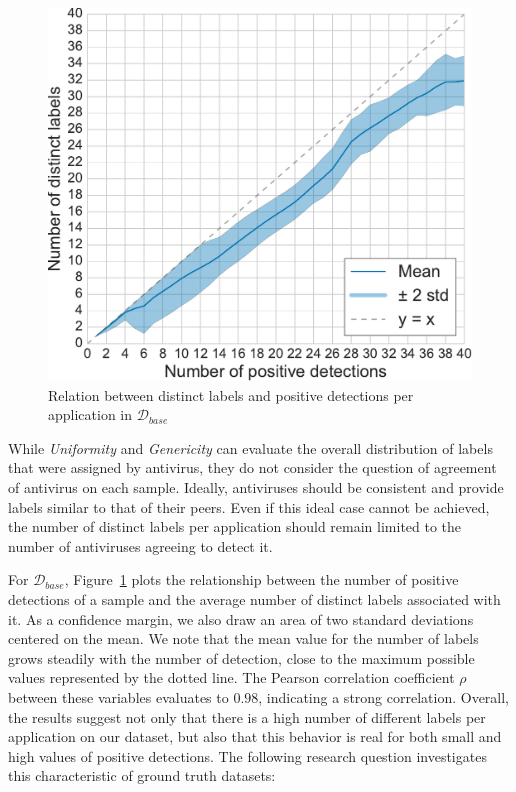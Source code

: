\begin{figure}[!ht]
        \centering
	\includegraphics[width=0.75\linewidth]{figures/stase/divergence.pdf}
        \caption[Relation between distinct labels and positive detections per application]{Relation between distinct labels and positive detections per application in $\mathcal{D}_{base}$}
	\label{figure:stase:divergence}
\end{figure}

While \emph{Uniformity} and \emph{Genericity} can evaluate the overall distribution of labels that were assigned by antivirus, they do not consider the question of agreement of antivirus on each sample.
Ideally, antiviruses should be consistent and provide labels similar to that of their peers.
Even if this ideal case cannot be achieved, the number of distinct labels per application should remain limited to the number of antiviruses agreeing to detect it.

For $\mathcal{D}_{base}$, Figure~\ref{figure:stase:divergence} plots the relationship between the number of positive detections of a sample and the average number of distinct labels associated with it.
As a confidence margin, we also draw an area of two standard deviations centered on the mean.
We note that the mean value for the number of labels grows steadily with the number of detection, close to the maximum possible values represented by the dotted line.
The Pearson correlation coefficient $\rho$ between these variables evaluates to $0.98$, indicating a strong correlation.
Overall, the results suggest not only that there is a high number of different labels per application on our dataset, but also that this behavior is real for both small and high values of positive detections.
The following research question investigates this characteristic of ground truth datasets:

